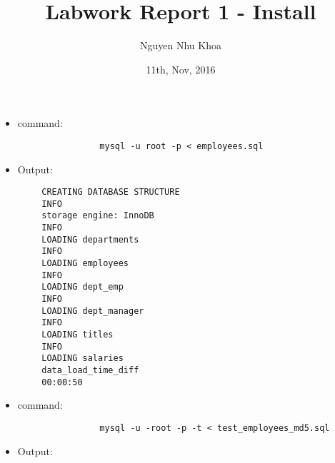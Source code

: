 \documentclass[12pt, letterpaper, twoside]{article}
\title{Labwork Report 1 - Install}
\author{Nguyen Nhu Khoa}
\date{11th, Nov, 2016}
\begin{document}
	\begin{itemize}
		\item command: 
			\begin{verbatim}
				mysql -u root -p < employees.sql
			\end{verbatim}
		\item Output:
	\end{itemize}
	\begin{verbatim}
		CREATING DATABASE STRUCTURE
		INFO
		storage engine: InnoDB
		INFO
		LOADING departments
		INFO
		LOADING employees
		INFO
		LOADING dept_emp
		INFO
		LOADING dept_manager
		INFO
		LOADING titles
		INFO
		LOADING salaries
		data_load_time_diff
		00:00:50
	\end{verbatim}
	
	\newpage
	\begin{itemize}
		\item command: 
			\begin{verbatim}
				mysql -u -root -p -t < test_employees_md5.sql
			\end{verbatim}
		\item Output:
	\end{itemize}
\end{document}
